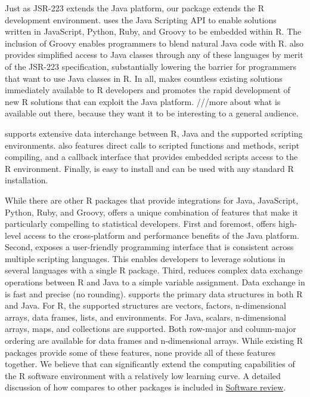 Just as JSR-223 extends the Java platform, our  package extends the R development environment.  uses the Java Scripting API to enable solutions written in JavaScript, Python, Ruby, and Groovy to be embedded within R. The inclusion of Groovy enables programmers to blend natural Java code with R.  also provides simplified access to Java classes through any of these languages by merit of the JSR-223 specification, substantially lowering the barrier for programmers that want to use Java classes in R. In all,  makes countless existing solutions immediately available to R developers and promotes the rapid development of new R solutions that can exploit the Java platform. ///more about what is available out there, because they want it to be interesting to a general audience.

 supports extensive data interchange between R, Java and the supported scripting environments.  also features direct calls to scripted functions and methods, script compiling, and a callback interface that provides embedded scripts access to the R environment. Finally,  is easy to install and can be used with any standard R installation.

While there are other R packages that provide integrations for Java, JavaScript, Python, Ruby, and Groovy,  offers a unique combination of features that make it particularly compelling to statistical developers. First and foremost,  offers high-level access to the cross-platform and performance benefits of the Java platform. Second,  exposes a user-friendly programming interface that is consistent across multiple scripting languages. This enables developers to leverage solutions in several languages with a single R package. Third,  reduces complex data exchange operations between R and Java to a simple variable assignment. Data exchange in  is fast and precise (no rounding).  supports the primary data structures in both R and Java. For R, the supported structures are vectors, factors, n-dimensional arrays, data frames, lists, and environments. For Java, scalars, n-dimensional arrays, maps, and collections are supported. Both row-major and column-major ordering are available for data frames and n-dimensional arrays. While existing R packages provide some of these features, none provide all of these features together. We believe that  can significantly extend the computing capabilities of the R software environment with a relatively low learning curve. A detailed discussion of how  compares to other packages is included in \hyperlink{softwarereview}{Software review}.

